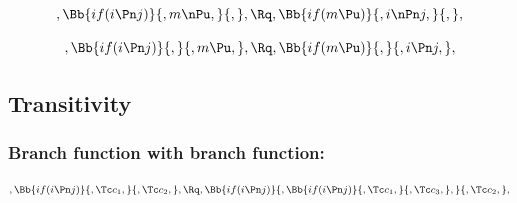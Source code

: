 \bigskip
\bigskip
\[, \Bb{if(i \Pn j)}{,m \nPu,}{,}, \Rq , \Bb{if(m \Pu)}{,i \nPn j,}{,},\]

\bigskip
\bigskip
\[, \Bb{if(i \Pn j)}{,}{,m \Pu,}, \Rq , \Bb{if(m \Pu)}{,}{,i \Pn j,},\]




\bigskip
\bigskip
\bigskip
\bigskip
\subsection{Transitivity}
\subsubsection{Branch function with branch function:}
\[, \Bb{if(i \Pn j)}{,\Tc c_1,}{,\Tc c_2,}, \Rq , \Bb{if(i \Pn j)}{,\Bb{if(i \Pn j)}{,\Tc c_1,}{,\Tc c_3,},}{,\Tc c_2,},\]

